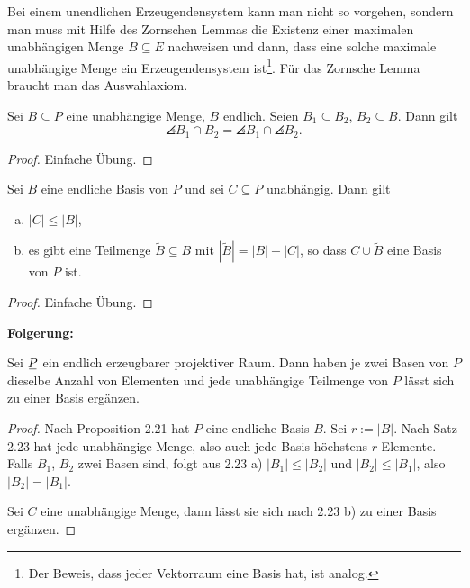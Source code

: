 \begin{rmrk*}
 Bei einem unendlichen Erzeugendensystem kann man nicht so vorgehen, sondern man muss mit Hilfe des Zornschen Lemmas die Existenz einer maximalen unabhängigen Menge $B \subseteq E$ nachweisen und dann, dass eine solche maximale unabhängige Menge ein Erzeugendensystem ist\footnote{Der Beweis, dass jeder Vektorraum eine Basis hat, ist analog.}. Für das Zornsche Lemma braucht man das Auswahlaxiom.
\end{rmrk*}

\clearpage

\begin{lem}
 Sei $B \subseteq P$ eine unabhängige Menge, $B$ endlich. Seien $B_1 \subseteq B_2$, $B_2 \subseteq B$. Dann gilt
 \[ \angles{ B_1 \cap B_2 } = \angles{B_1} \cap \angles{B_2}. \]
\end{lem}

\begin{proof}
 Einfache Übung.
\end{proof}

\begin{thm}
 Sei $B$ eine endliche Basis von $P$ und sei $C \subseteq P$ unabhängig. Dann gilt
 \begin{enumerate}[a)]
  \item $|C| \le |B|$,
  \item es gibt eine Teilmenge $\tilde{B} \subseteq B$ mit $|\tilde{B}| = |B| - |C|$, so dass $C \cup \tilde{B}$ eine Basis von $P$ ist.
 \end{enumerate}
\end{thm}

\begin{proof}
 Einfache Übung.
\end{proof}

\textbf{Folgerung:}
\begin{thm}[Basisergänzungssatz]
 Sei $\proj$ ein endlich erzeugbarer projektiver Raum. Dann haben je zwei Basen von $P$ dieselbe Anzahl von Elementen und jede unabhängige Teilmenge von $P$ lässt sich zu einer Basis ergänzen.
\end{thm}

\begin{proof}
 Nach Proposition 2.21 hat $P$ eine endliche Basis $B$. Sei $r := |B|$. Nach Satz 2.23 hat jede unabhängige Menge, also auch jede Basis höchstens $r$ Elemente. Falls $B_1$, $B_2$ zwei Basen sind, folgt aus 2.23 a) $|B_1| \le |B_2|$ und $|B_2| \le |B_1|$, also $|B_2| = |B_1|$.
 
 Sei $C$ eine unabhängige Menge, dann lässt sie sich nach 2.23 b) zu einer Basis ergänzen.
\end{proof}


